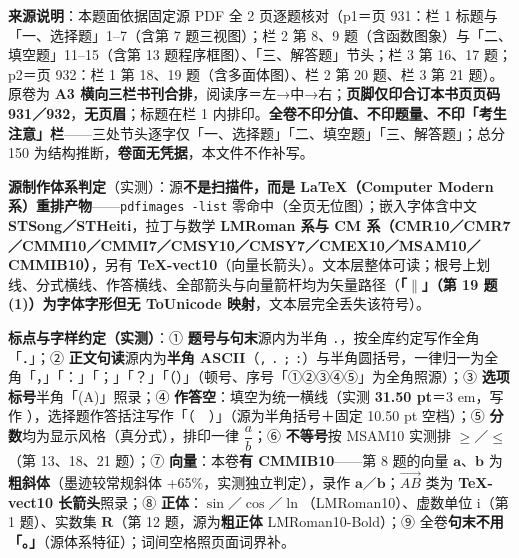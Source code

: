 


\begin{gktip}
\textbf{来源说明}：本题面依据固定源 PDF 全 2 页逐题核对（p1＝页 931：栏 1 标题与「一、选择题」1–7（含第 7 题三视图）；栏 2 第 8、9 题（含函数图象）与「二、填空题」11–15（含第 13 题程序框图）、「三、解答题」节头；栏 3 第 16、17 题；p2＝页 932：栏 1 第 18、19 题（含多面体图）、栏 2 第 20 题、栏 3 第 21 题）。原卷为 \textbf{A3 横向三栏书刊合排}，阅读序＝左→中→右；\textbf{页脚仅印合订本书页页码 931／932}，\textbf{无页眉}；标题在栏 1 内排印。\textbf{全卷不印分值、不印题量、不印「考生注意」栏}——三处节头逐字仅「一、选择题」「二、填空题」「三、解答题」；总分 150 为结构推断，\textbf{卷面无凭据}，本文件不作补写。

\textbf{源制作体系判定}（实测）：源\textbf{不是扫描件，而是 LaTeX（Computer Modern 系）重排产物}——\texttt{pdfimages -list} 零命中（全页无位图）；嵌入字体含中文 \textbf{STSong／STHeiti}，拉丁与数学 \textbf{LMRoman 系与 CM 系（CMR10／CMR7／CMMI10／CMMI7／CMSY10／CMSY7／CMEX10／MSAM10／CMMIB10）}，另有 \textbf{TeX-vect10}（向量长箭头）。文本层整体可读；根号上划线、分式横线、作答横线、全部箭头与向量箭杆均为矢量路径（\textbf{「$\parallel$」（第 19 题 (1)）为字体字形但无 ToUnicode 映射}，文本层完全丢失该符号）。

\textbf{标点与字样约定（实测）}：① \textbf{题号与句末}源内为半角 \texttt{.}，按全库约定写作全角「．」；② \textbf{正文句读}源内为\textbf{半角 ASCII}（\texttt{,} \texttt{.} \texttt{;} \texttt{:}）与半角圆括号，一律归一为全角「，」「：」「；」「？」「（）」（顿号、序号「①②③④⑤」为全角照源）；③ \textbf{选项标号}半角「(A)」照录；④ \textbf{作答空}：填空为统一横线（实测 \textbf{31.50 pt}＝3 em，写作 \texttt{\gkblank{}}），选择题作答括注写作「（　）」（源为半角括号＋固定 10.50 pt 空档）；⑤ \textbf{分数}均为显示风格（真分式），排印一律 \(\dfrac{a}{b}\)；⑥ \textbf{不等号}按 MSAM10 实测排 \(\geqslant\)／\(\leqslant\)（第 13、18、21 题）；⑦ \textbf{向量}：本卷\textbf{有 CMMIB10}——第 8 题的向量 \(\boldsymbol{a}\)、\(\boldsymbol{b}\) 为\textbf{粗斜体}（墨迹较常规斜体 +65\%，实测独立判定），录作 \(\boldsymbol{a}\)／\(\boldsymbol{b}\)；\(\overrightarrow{AB}\) 类为 \textbf{TeX-vect10 长箭头}照录；⑧ \textbf{正体}：\(\sin\)／\(\cos\)／\(\ln\)（LMRoman10）、虚数单位 \(\mathrm{i}\)（第 1 题）、实数集 \(\mathbf{R}\)（第 12 题，源为\textbf{粗正体} LMRoman10-Bold）；⑨ 全卷\textbf{句末不用「。」}（源体系特征）；词间空格照页面词界补。


\end{gktip}
